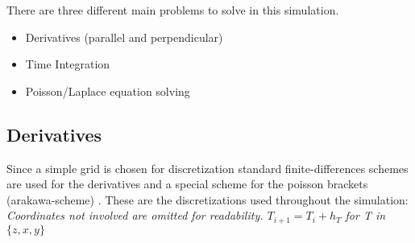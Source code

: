 \documentclass[master.tex]{subfiles}
\begin{document}
There are three different main problems to solve in this simulation.
\begin{itemize}
    \item Derivatives (parallel and perpendicular)
    \item Time Integration
    \item Poisson/Laplace equation solving
\end{itemize}

\subsection{Derivatives}
Since a simple grid is chosen for discretization standard finite-differences schemes are used for the derivatives and a special scheme for the poisson brackets (arakawa-scheme) \cite{arakawa}.\newline
These are the discretizations used throughout the simulation:\newline
\textit{Coordinates not involved are omitted for readability. $T_{i + 1} = T_i + h_T$ for T in $\{z, x, y\}$}
\end{document}
